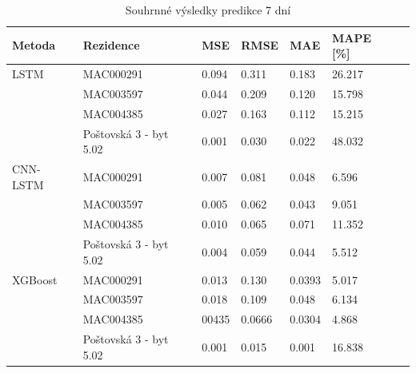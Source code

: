 \documentclass[FM,BP,fonts]{tulthesis}
\begin{document}
\begin{table}[!ht]
	\centering
	\caption{Souhrnné výsledky predikce 7 dní}
	\label{Tab:7dayresults}
	\def\arraystretch{1.2}
	\begin{tabular}{lllllll}
		\hline
		\textbf{Metoda} & \textbf{Rezidence} & \textbf{MSE} & \textbf{RMSE} & \textbf{MAE} & \textbf{MAPE [\%]} \\      \hline
		LSTM            & MAC000291          &  0.094          & 0.311           & 0.183           & 26.217              \\ 
		~               & MAC003597          & 0.044            & 0.209             & 0.120            & 15.798             \\  
		~               & MAC004385          & 0.027           & 0.163           & 0.112           & 15.215          \\ 
		~               & Poštovská 3 - byt 5.02              & 0.001            & 0.030             & 0.022           & 48.032 \\         
		
		\hline
		
		CNN-LSTM        & MAC000291          & 0.007               & 0.081              & 0.048           & 6.596              \\ 
		~               & MAC003597          & 0.005            & 0.062             & 0.043            & 9.051             \\  
		~               & MAC004385          & 0.010            & 0.065             & 0.071           & 11.352            \\ 
		~               & Poštovská 3 - byt 5.02              & 0.004            & 0.059             & 0.044           &	5.512\\         
		
		\hline
		
		
		XGBoost         & MAC000291          & 0.013	       & 0.130             &  0.0393        &  5.017            \\ 
		~               & MAC003597          & 0.018            & 0.109             & 0.048            & 6.134             \\  
		~               & MAC004385          & 00435            & 0.0666             &  0.0304            &  4.868             \\ 
		~               & Poštovská 3 - byt 5.02  & 0.001          & 0.015             & 0.001            & 16.838\\   
		
		\hline
		

\end{tabular}
\end{table}
\end{document}
